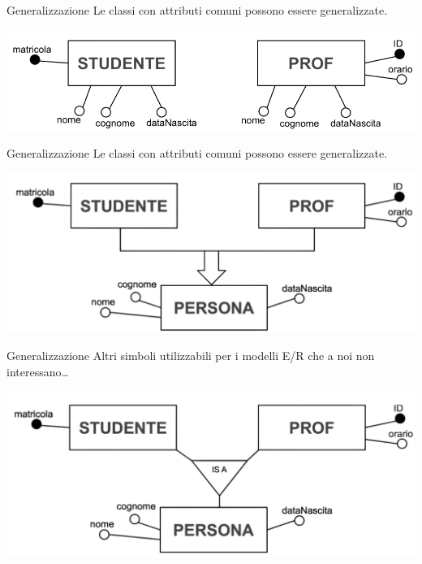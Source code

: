 \begin{frame}{Generalizzazione}
Le classi con attributi comuni possono essere generalizzate.
    \begin{center}
        \includegraphics[width=.8\textwidth]{sections/er-model/img/generalization1.png}
    \end{center}
\end{frame}
%
\begin{frame}{Generalizzazione}
Le classi con attributi comuni possono essere generalizzate.
    \begin{center}
        \includegraphics[width=.8\textwidth]{sections/er-model/img/generalization2.png}
    \end{center}
\end{frame}
%
\begin{frame}{Generalizzazione}
Altri simboli utilizzabili per i modelli E/R che a noi non interessano\ldots
    \begin{center}
        \includegraphics[width=.8\textwidth]{sections/er-model/img/generalization3.png}
    \end{center}
\end{frame}
%
